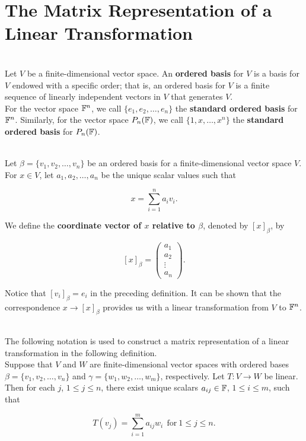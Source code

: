 \section{The Matrix Representation of a Linear Transformation}

\begin{definition}
	\hfill\\
	Let $V$ be a finite-dimensional vector space. An \textbf{ordered basis} for $V$ is a basis for $V$ endowed with a specific order; that is, an ordered basis for $V$ is a finite sequence of linearly independent vectors in $V$ that generates $V$.\\

	For the vector space $\mathbb{F}^n$, we call $\{e_1, e_2, \dots, e_n\}$ the \textbf{standard ordered basis} for $\mathbb{F}^n$. Similarly, for the vector space $P_n(\mathbb{F})$, we call $\{1, x, \dots, x^n\}$ the \textbf{standard ordered basis} for $P_n(\mathbb{F})$.
\end{definition}

\begin{definition}
	\hfill\\
	Let $\beta = \{v_1, v_2, \dots, v_n\}$ be an ordered basis for a finite-dimensional vector space $V$. For $x \in V$, let $a_1, a_2, \dots, a_n$ be the unique scalar values such that

	\[x = \sum_{i=1}^{n}a_iv_i.\]

	We define the \textbf{coordinate vector of $x$ relative to $\beta$}, denoted by $[x]_\beta$, by

	\[[x]_\beta = \begin{pmatrix} a_1 \\ a_2 \\ \vdots \\ a_n\end{pmatrix}.\]

	Notice that $[v_i]_\beta = e_i$ in the preceding definition. It can be shown that the correspondence $x \to [x]_\beta$ provides us with a linear transformation from $V$ to $\mathbb{F}^n$.
\end{definition}

\begin{notation}
	\hfill\\
	The following notation is used to construct a matrix representation of a linear transformation in the following definition.\\

	Suppose that $V$ and $W$ are finite-dimensional vector spaces with ordered bases $\beta = \{v_1, v_2, \dots, v_n\}$ and $\gamma = \{w_1, w_2, \dots, w_m\}$, respectively. Let $T: V \to W$ be linear. Then for each $j$, $1 \leq j \leq n$, there exist unique scalars $a_{ij} \in \mathbb{F}$, $1 \leq i \leq m$, such that

	\[T(v_j) = \sum_{i=1}^{m}a_{ij}w_i\ \ \text{for}\ 1 \leq j \leq n.\]
\end{notation}

